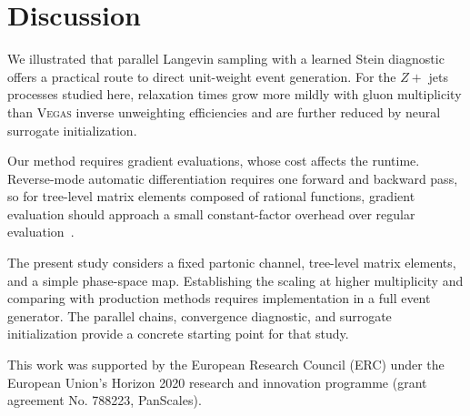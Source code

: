 \documentclass{article}
\newcommand{\vegas}{\textsc{Vegas}}
\begin{document}
\section{Discussion}

We illustrated that parallel Langevin sampling with a learned Stein diagnostic offers a practical route to direct unit-weight event generation.
For the $Z+$ jets processes studied here, relaxation times grow more mildly with gluon multiplicity than \vegas{} inverse unweighting efficiencies and are further reduced by neural surrogate initialization.

Our method requires gradient evaluations, whose cost affects the runtime.
Reverse-mode automatic differentiation requires one forward and backward pass, so for tree-level matrix elements composed of rational functions, gradient evaluation should approach a small constant-factor overhead over regular evaluation~\cite{baur1983complexity,griewank2012invented}.

The present study considers a fixed partonic channel, tree-level matrix elements, and a simple phase-space map.
Establishing the scaling at higher multiplicity and comparing with production methods requires implementation in a full event generator.
The parallel chains, convergence diagnostic, and surrogate initialization provide a concrete starting point for that study.

\clearpage
\begin{ack}
This work was supported by the European Research Council (ERC) under the European Union’s Horizon 2020 research and innovation programme (grant agreement No. 788223, PanScales).
\end{ack}




\clearpage


\clearpage
\appendix
\end{document}

